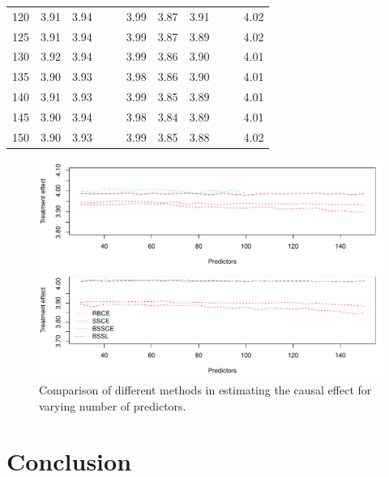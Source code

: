 \documentclass[preprint,12pt]{elsarticle}
\begin{document}
\begin{table}[ht]
\begin{tabular}{c|ccccc|ccccc}
  120 & 3.91 & 3.94 &  &  & 3.99 & 3.87 & 3.91 &  &  & 4.02 \\ 
  125 & 3.91 & 3.94 &  &  & 3.99 & 3.87 & 3.89 &  &  & 4.02 \\ 
  130 & 3.92 & 3.94 &  &  & 3.99 & 3.86 & 3.90 &  &  & 4.01 \\ 
  135 & 3.90 & 3.93 &  &  & 3.98 & 3.86 & 3.90 &  &  & 4.01 \\ 
  140 & 3.91 & 3.93 &  &  & 3.99 & 3.85 & 3.89 &  &  & 4.01 \\ 
  145 & 3.90 & 3.94 &  &  & 3.98 & 3.84 & 3.89 &  &  & 4.01 \\ 
  150 & 3.90 & 3.93 &  &  & 3.99 & 3.85 & 3.88 &  &  & 4.02 \\ 
   \hline
\end{tabular}
\label{tab:causal2}
\end{table}

\begin{figure}
    \centering
    \includegraphics[width = 0.9\linewidth]{treat_pred.pdf}
    \caption{Comparison of different methods in estimating the causal effect for varying number of predictors.}
    \label{fig:comp:trt:pred}
\end{figure}



\section{Conclusion}\label{sec:conc}
\end{document}
